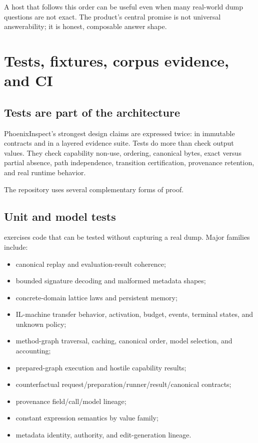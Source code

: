 \documentclass[11pt,oneside,openany]{book}
\newcommand{\repoPath}[1]{\path{#1}}
\begin{document}
A host that follows this order can be useful even when many real-world dump questions are not exact. The product's central promise is not universal answerability; it is honest, composable answer shape.

\chapter{Tests, fixtures, corpus evidence, and CI}
\label{ch:tests}

\section{Tests are part of the architecture}

PhoenixInspect's strongest design claims are expressed twice: in immutable contracts and in a layered evidence suite. Tests do more than check output values. They check capability non-use, ordering, canonical bytes, exact versus partial absence, path independence, transition certification, provenance retention, and real runtime behavior.

The repository uses several complementary forms of proof.

\section{Unit and model tests}

\repoPath{PhoenixInspect.Tests} exercises code that can be tested without capturing a real dump. Major families include:

\begin{itemize}
  \item canonical replay and evaluation-result coherence;
  \item bounded signature decoding and malformed metadata shapes;
  \item concrete-domain lattice laws and persistent memory;
  \item IL-machine transfer behavior, activation, budget, events, terminal states, and unknown policy;
  \item method-graph traversal, caching, canonical order, model selection, and accounting;
  \item prepared-graph execution and hostile capability results;
  \item counterfactual request/preparation/runner/result/canonical contracts;
  \item provenance field/call/model lineage;
  \item constant expression semantics by value family;
  \item metadata identity, authority, and edit-generation lineage.
\end{itemize}
\end{document}
